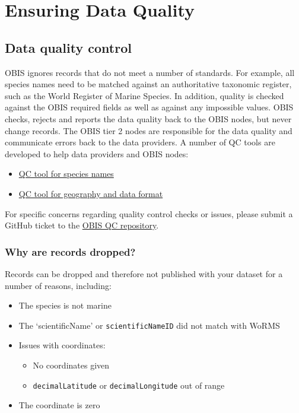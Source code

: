 \documentclass[
  letterpaper,
  DIV=11,
  numbers=noendperiod,
  oneside]{scrreprt}
\providecommand{\tightlist}{%
  \setlength{\itemsep}{0pt}\setlength{\parskip}{0pt}}\usepackage{longtable,booktabs,array}
\begin{document}
\part{Ensuring Data Quality}

\hypertarget{data-quality-control}{%
\chapter{Data quality control}\label{data-quality-control}}

OBIS ignores records that do not meet a number of standards. For
example, all species names need to be matched against an authoritative
taxonomic register, such as the World Register of Marine Species. In
addition, quality is checked against the OBIS required fields as well as
against any impossible values. OBIS checks, rejects and reports the data
quality back to the OBIS nodes, but never change records. The OBIS tier
2 nodes are responsible for the data quality and communicate errors back
to the data providers. A number of QC tools are developed to help data
providers and OBIS nodes:

\begin{itemize}
\tightlist
\item
  \href{name_matching.html}{QC tool for species names}
\item
  \href{lifewatch_qc.html}{QC tool for geography and data format}
\end{itemize}

For specific concerns regarding quality control checks or issues, please
submit a GitHub ticket to the
\href{https://github.com/iobis/obis-qc/issues}{OBIS QC repository}.

\hypertarget{why-are-records-dropped}{%
\section{Why are records dropped?}\label{why-are-records-dropped}}

Records can be dropped and therefore not published with your dataset for
a number of reasons, including:

\begin{itemize}
\tightlist
\item
  The species is not marine
\item
  The `scientificName' or \texttt{scientificNameID} did not match with
  WoRMS
\item
  Issues with coordinates:

  \begin{itemize}
  \tightlist
  \item
    No coordinates given
  \item
    \texttt{decimalLatitude} or \texttt{decimalLongitude} out of range
  \end{itemize}
\item
  The coordinate is zero
\end{itemize}
\end{document}
